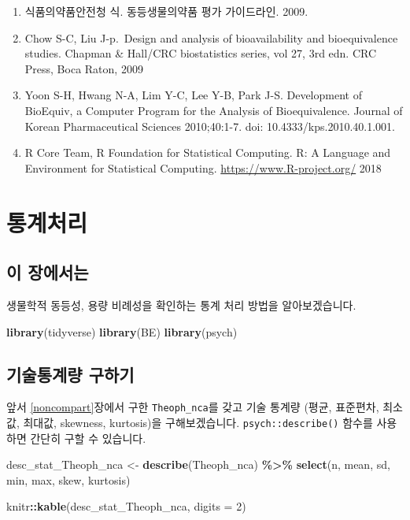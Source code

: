 \documentclass[
  10pt,
]{krantz}
\makeatletter
\newenvironment{Shaded}{\begin{snugshade}}{\end{snugshade}}
\newcommand{\DataTypeTok}[1]{\textcolor[rgb]{0.13,0.29,0.53}{#1}}
\newcommand{\DecValTok}[1]{\textcolor[rgb]{0.00,0.00,0.81}{#1}}
\newcommand{\KeywordTok}[1]{\textcolor[rgb]{0.13,0.29,0.53}{\textbf{#1}}}
\newcommand{\NormalTok}[1]{#1}
\newcommand{\OperatorTok}[1]{\textcolor[rgb]{0.81,0.36,0.00}{\textbf{#1}}}
\newcommand{\StringTok}[1]{\textcolor[rgb]{0.31,0.60,0.02}{#1}}
\providecommand{\tightlist}{%
  \setlength{\itemsep}{0pt}\setlength{\parskip}{0pt}}
\newenvironment{kframe}{%
\medskip{}
\setlength{\fboxsep}{.8em}
 \def\at@end@of@kframe{}%
 \ifinner\ifhmode%
  \def\at@end@of@kframe{\end{minipage}}%
  \begin{minipage}{\columnwidth}%
 \fi\fi%
 \def\FrameCommand##1{\hskip\@totalleftmargin \hskip-\fboxsep
 \colorbox{shadecolor}{##1}\hskip-\fboxsep
     \hskip-\linewidth \hskip-\@totalleftmargin \hskip\columnwidth}%
 \MakeFramed {\advance\hsize-\width
   \@totalleftmargin\z@ \linewidth\hsize
   \@setminipage}}%
 {\par\unskip\endMakeFramed%
 \at@end@of@kframe}
\renewenvironment{Shaded}{\begin{kframe}}{\end{kframe}}
\makeatother
\begin{document}
\begin{enumerate}
\def\labelenumi{\arabic{enumi}.}
\tightlist
\item
  식품의약품안전청 식. 동등생물의약품 평가 가이드라인. 2009.
\item
  Chow S-C, Liu J-p.~Design and analysis of bioavailability and bioequivalence studies. Chapman \& Hall/CRC biostatistics series, vol 27, 3rd edn. CRC Press, Boca Raton, 2009
\item
  Yoon S-H, Hwang N-A, Lim Y-C, Lee Y-B, Park J-S. Development of BioEquiv, a Computer Program for the Analysis of Bioequivalence. Journal of Korean Pharmaceutical Sciences 2010;40:1-7. doi: 10.4333/kps.2010.40.1.001.
\item
  R Core Team, R Foundation for Statistical Computing. R: A Language and Environment for Statistical Computing. \url{https://www.R-project.org/} 2018
\end{enumerate}

\hypertarget{statistics}{%
\chapter{통계처리}\label{statistics}}

\hypertarget{stat-intro}{%
\section{이 장에서는}\label{stat-intro}}

생물학적 동등성, 용량 비례성을 확인하는 통계 처리 방법을 알아보겠습니다.

\begin{Shaded}
\begin{Highlighting}[]
\KeywordTok{library}\NormalTok{(tidyverse)}
\KeywordTok{library}\NormalTok{(BE)}
\KeywordTok{library}\NormalTok{(psych)}
\end{Highlighting}
\end{Shaded}

\hypertarget{stat-desc}{%
\section{기술통계량 구하기}\label{stat-desc}}

앞서 \ref{noncompart}장에서 구한 \texttt{Theoph\_nca}를 갖고 기술 통계량 (평균, 표준편차, 최소값, 최대값, skewness, kurtosis)을 구해보겠습니다. \texttt{psych::describe()} 함수를 사용하면 간단히 구할 수 있습니다.

\begin{Shaded}
\begin{Highlighting}[]
\NormalTok{desc\_stat\_Theoph\_nca \textless{}{-}}\StringTok{ }\KeywordTok{describe}\NormalTok{(Theoph\_nca) }\OperatorTok{\%\textgreater{}\%}\StringTok{ }
\StringTok{  }\KeywordTok{select}\NormalTok{(n, mean, sd, min, max, skew, kurtosis)}

\NormalTok{knitr}\OperatorTok{::}\KeywordTok{kable}\NormalTok{(desc\_stat\_Theoph\_nca, }\DataTypeTok{digits =} \DecValTok{2}\NormalTok{)}
\end{Highlighting}
\end{Shaded}
\end{document}
